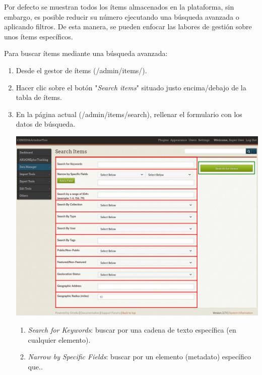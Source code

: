 \documentclass[
]{article}
\providecommand{\tightlist}{%
  \setlength{\itemsep}{0pt}\setlength{\parskip}{0pt}}
\begin{document}
Por defecto se muestran todos los ítems almacenados en la plataforma,
sin embargo, es posible reducir su número ejecutando una búsqueda
avanzada o aplicando filtros. De esta manera, se pueden enfocar las
labores de gestión sobre unos ítems específicos.

Para buscar ítems mediante una búsqueda avanzada:

\begin{enumerate}
\def\labelenumi{\arabic{enumi}.}
\item
  Desde el gestor de ítems ({/admin/items/}).
\item
  Hacer clic sobre el botón "\emph{Search items}" situado justo
  encima/debajo de la tabla de ítems.
\item
  En la página actual ({/admin/items/search}), rellenar el formulario
  con los datos de búsqueda.

  \includegraphics{../_static/images/advanced-search.png}

  \begin{enumerate}
  \def\labelenumii{\alph{enumii}.}
  \tightlist
  \item
    \emph{Search for Keywords}: buscar por una cadena de texto
    específica (en cualquier elemento).
  \item
    \emph{Narrow by Specific Fields}: buscar por un elemento (metadato)
    específico que..


\end{enumerate}
\end{enumerate}
\end{document}
